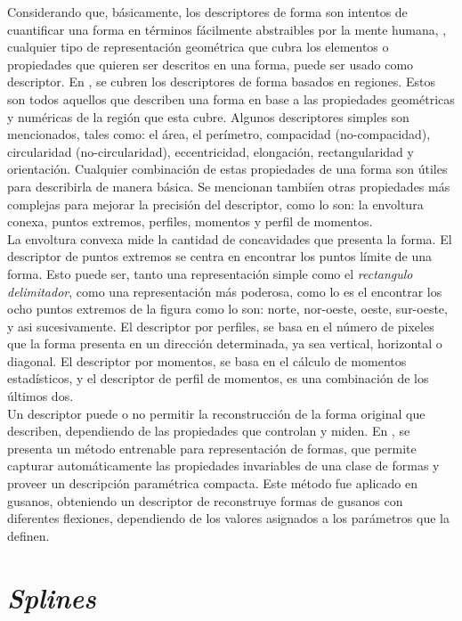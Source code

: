 Considerando que, b\'asicamente, los descriptores de forma son intentos de cuantificar
una forma en t\'erminos f\'acilmente abstraibles por la mente humana, \cite[p.1]{desclecture},
cualquier tipo de representaci\'on geom\'etrica que cubra los elementos o propiedades que
quieren ser descritos en una forma, puede ser usado como descriptor. En \cite{desclecture},
se cubren los descriptores de forma basados en regiones. Estos son todos aquellos que describen
una forma en base a las propiedades geom\'etricas y num\'ericas de la regi\'on que esta cubre.
Algunos descriptores simples son mencionados, tales como: el \'area, el per\'imetro,
compacidad (no-compacidad), circularidad (no-circularidad), eccentricidad, elongaci\'on,
rectangularidad y orientaci\'on. Cualquier combinaci\'on de estas propiedades de una forma
son \'utiles para describirla de manera b\'asica. Se mencionan tambi\'ien otras propiedades
m\'as complejas para mejorar la precisi\'on del descriptor, como lo son: la envoltura conexa, 
puntos extremos, perfiles, momentos y perfil de momentos.\\
La envoltura convexa mide la cantidad de concavidades que presenta la forma.
El descriptor de puntos extremos se centra en encontrar los puntos l\'imite de una forma. Esto puede ser, 
tanto una representaci\'on simple como el \emph{rectangulo delimitador}, como una
representaci\'on m\'as poderosa, como lo es el encontrar los ocho puntos extremos de la figura
como lo son: norte, nor-oeste, oeste, sur-oeste, y asi sucesivamente. El descriptor por
perfiles, se basa en el n\'umero de pixeles que la forma presenta en un direcci\'on determinada,
ya sea vertical, horizontal o diagonal. El descriptor por momentos, se basa en el c\'alculo
de momentos estad\'isticos, y el descriptor de perfil de momentos, es una combinaci\'on de
los \'ultimos dos.\\


Un descriptor puede o no permitir la reconstrucci\'on de la forma original que
describen, dependiendo de las propiedades que controlan y miden.
En \cite{wormparam}, se presenta un m\'etodo entrenable para representaci\'on
de formas, que permite capturar autom\'aticamente las propiedades invariables
de una clase de formas y proveer un descripci\'on param\'etrica compacta. Este
m\'etodo fue aplicado en gusanos, obteniendo un descriptor de reconstruye
formas de gusanos con diferentes flexiones, dependiendo de los valores
asignados a los par\'ametros que la definen.

\section{\emph{Splines}}
\label{sec:splines}

